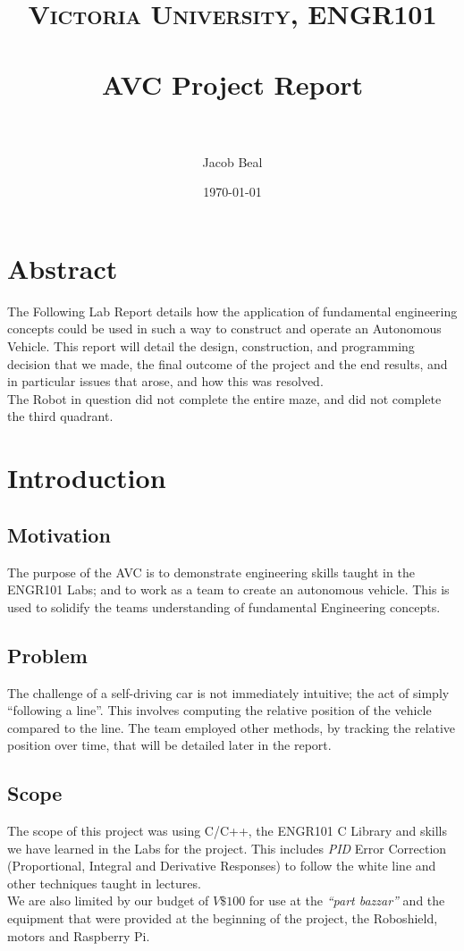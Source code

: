 \documentclass[paper=a4, fontsize=11pt]{scrartcl} %
\title{
\normalfont\normalsize
\textsc{Victoria University, ENGR101} \\ [25pt] %
\horrule{0.5pt} \\[0.4cm] %
\huge AVC Project Report\\ %
\horrule{2pt} \\[0.5cm] %
}
\author{Jacob Beal} %
\date{\normalsize\today} %
\numberwithin{equation}{section} %
\numberwithin{figure}{section} %
\begin{document}
\maketitle
\pagebreak
\tableofcontents
\pagebreak

\section{Abstract}
The Following Lab Report details how the application of fundamental engineering
concepts could be used in such a way to construct and operate an Autonomous
Vehicle. This report will detail the design, construction, and programming
decision that we made, the final outcome of the project and the end results,
and in particular issues that arose, and how this was resolved.\\

The Robot in question did not complete the entire maze, and did not complete the
third quadrant.





\section{Introduction}
\subsection{Motivation}
The purpose of the AVC is to demonstrate engineering skills taught in the
ENGR101 Labs; and to work as a team to create an autonomous vehicle. This is
used to solidify the teams understanding of fundamental Engineering concepts.
\subsection{Problem}
The challenge of a self-driving car is not immediately intuitive; the act of %
simply ``following a line''. This involves computing the relative position of
the vehicle compared to the line. The team employed other methods, by tracking
the relative position over time, that will be detailed later in the report.
\subsection{Scope}
The scope of this project was using C/C++, the ENGR101 C Library and skills we
have learned in the Labs for the project. This includes \textit{PID} Error
Correction (Proportional, Integral and Derivative Responses) to follow the 
white line and other techniques taught in lectures.\\
We are also limited by our budget of $V\$100$ for use at the \textit{``part
  bazzar''} and the equipment that were provided at the beginning of the
project, the Roboshield, motors and Raspberry Pi.
\end{document}
